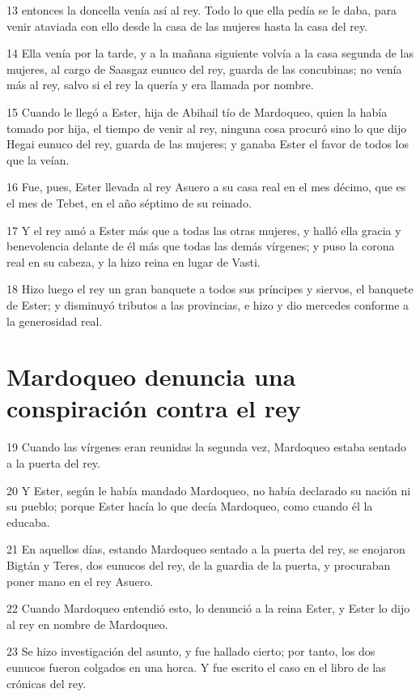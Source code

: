 \par 13 entonces la doncella venía así al rey. Todo lo que ella pedía se le daba, para venir ataviada con ello desde la casa de las mujeres hasta la casa del rey.
\par 14 Ella venía por la tarde, y a la mañana siguiente volvía a la casa segunda de las mujeres, al cargo de Saasgaz eunuco del rey, guarda de las concubinas; no venía más al rey, salvo si el rey la quería y era llamada por nombre.
\par 15 Cuando le llegó a Ester, hija de Abihail tío de Mardoqueo, quien la había tomado por hija, el tiempo de venir al rey, ninguna cosa procuró sino lo que dijo Hegai eunuco del rey, guarda de las mujeres; y ganaba Ester el favor de todos los que la veían.
\par 16 Fue, pues, Ester llevada al rey Asuero a su casa real en el mes décimo, que es el mes de Tebet, en el año séptimo de su reinado.
\par 17 Y el rey amó a Ester más que a todas las otras mujeres, y halló ella gracia y benevolencia delante de él más que todas las demás vírgenes; y puso la corona real en su cabeza, y la hizo reina en lugar de Vasti.
\par 18 Hizo luego el rey un gran banquete a todos sus príncipes y siervos, el banquete de Ester; y disminuyó tributos a las provincias, e hizo y dio mercedes conforme a la generosidad real.

\section*{Mardoqueo denuncia una conspiración contra el rey}

\par 19 Cuando las vírgenes eran reunidas la segunda vez, Mardoqueo estaba sentado a la puerta del rey.
\par 20 Y Ester, según le había mandado Mardoqueo, no había declarado su nación ni su pueblo; porque Ester hacía lo que decía Mardoqueo, como cuando él la educaba.
\par 21 En aquellos días, estando Mardoqueo sentado a la puerta del rey, se enojaron Bigtán y Teres, dos eunucos del rey, de la guardia de la puerta, y procuraban poner mano en el rey Asuero.
\par 22 Cuando Mardoqueo entendió esto, lo denunció a la reina Ester, y Ester lo dijo al rey en nombre de Mardoqueo.
\par 23 Se hizo investigación del asunto, y fue hallado cierto; por tanto, los dos eunucos fueron colgados en una horca. Y fue escrito el caso en el libro de las crónicas del rey.

